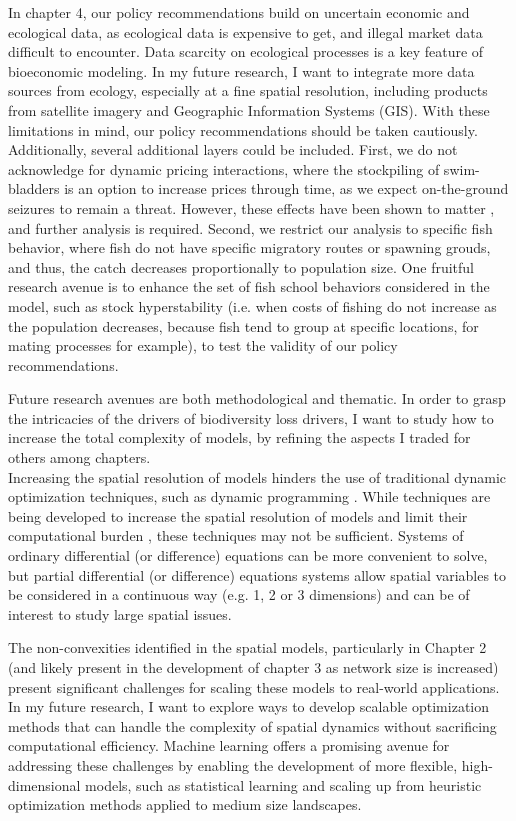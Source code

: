 In chapter 4, our policy recommendations build on uncertain economic and ecological data, as ecological data is expensive to get, and illegal market data difficult to encounter. Data scarcity on ecological processes is a key feature of bioeconomic modeling. In my future research, I want to integrate more data sources from ecology, especially at a fine spatial resolution, including products from satellite imagery and Geographic Information Systems (GIS). 
With these limitations in mind, our policy recommendations should be taken cautiously.  \\
Additionally, several additional layers could be included. First, we do not acknowledge for dynamic pricing interactions, where the stockpiling of swim-bladders is an option to increase prices through time, as we expect on-the-ground seizures to remain a threat. However, these effects have been shown to matter \citep{Kremer2000}, and further analysis is required. Second, we restrict our analysis to specific fish behavior, where fish do not have specific migratory routes or spawning grouds, and thus, the catch decreases proportionally to population size. One fruitful research avenue is to enhance the set of fish school behaviors considered in the model, such as stock hyperstability (i.e. when costs of fishing do not increase as the population decreases, because fish tend to group at specific locations, for mating processes for example), to test the validity of our policy recommendations. 


Future research avenues are both methodological and thematic. In order to grasp the intricacies of the drivers of biodiversity loss drivers, I want to study how to increase the total complexity of models, by refining the aspects I traded for others among chapters. \\

Increasing the spatial resolution of models hinders the use of traditional dynamic optimization techniques, such as dynamic programming \citep{Bellman}. While techniques are being developed to increase the spatial resolution of models and limit their computational burden \citep{brumm_adaptive_2017}, these techniques may not be sufficient. Systems of ordinary differential (or difference) equations can be more convenient to solve, but partial differential (or difference) equations \citep{brock_pattern_2010, brock_2020} systems allow spatial variables to be considered in a continuous way (e.g. 1, 2 or 3 dimensions) and can be of interest to study large spatial issues. 

The non-convexities identified in the spatial models, particularly in Chapter 2 (and likely present in the development of chapter 3 as network size is increased) present significant challenges for scaling these models to real-world applications. In my future research, I  want to explore ways to develop scalable optimization methods that can handle the complexity of spatial dynamics without sacrificing computational efficiency. Machine learning offers a promising avenue for addressing these challenges by enabling the development of more flexible, high-dimensional models, such as statistical learning and scaling up from heuristic optimization methods applied to medium size landscapes. 

